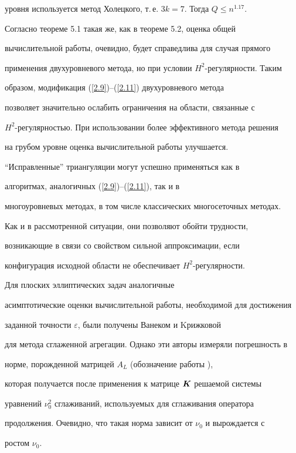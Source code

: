 уровня используется метод Холецкого, т.\,е. $3k=7$. Тогда $Q\le n^{1.17}$.


Согласно теореме 5.1 такая же, как в теореме 5.2, оценка общей


вычислительной работы, очевидно, будет справедлива для случая прямого


применения двухуровневого метода, но при условии $H^2$-регулярности. Таким


образом, модификация (\ref{2.9})--(\ref{2.11}) двухуровневого метода


позволяет значительно ослабить ограничения на области, связанные с


$H^2$-регулярностью. При использовании более эффективного метода решения


на грубом уровне оценка вычислительной работы улучшается.





\begin{notes}


``Исправленные'' триангуляции могут успешно применяться как в


алгоритмах, аналогичных (\ref{2.9})--(\ref{2.11}), так и в


многоуровневых методах, в том числе классических многосеточных методах.


Как и в рассмотренной ситуации, они позволяют обойти трудности,


возникающие в связи со свойством сильной аппроксимации, если


конфигурация исходной области не обеспечивает $H^2$-регулярности.


\end{notes}





\begin{notes}


Для плоских эллиптических задач аналогичные


асимптотические оценки вычислительной работы, необходимой для достижения


заданной точности $\varepsilon$, были получены Ванеком и Kрижковой \cite{[29]}


для метода сглаженной агрегации. Однако эти авторы измеряли погрешность в


норме, порожденной матрицей $A_L$ (обозначение работы \cite{[29]}),


которая получается после применения к матрице ${\boldsymbol K}$ решаемой системы


уравнений $\nu_0^2$ сглаживаний, используемых для сглаживания оператора


продолжения. Очевидно, что такая норма зависит от $\nu_0$ и вырождается с


ростом $\nu_0$.


\end{notes}





